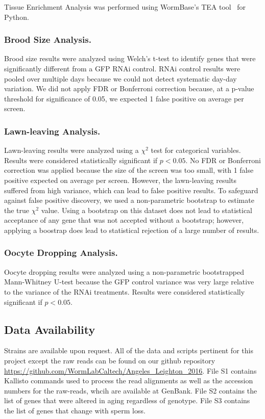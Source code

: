 \documentclass[9pt,twocolumn,twoside]{gsag3jnl}
\begin{document}
Tissue Enrichment Analysis was performed using WormBase's TEA tool~\citep{Angeles-Albores2016} for Python.

\subsubsection{Brood Size Analysis.}

Brood size results were analyzed using Welch's t-test to identify genes that were significantly different from a GFP RNAi control. RNAi control results were pooled over multiple days because we could not detect systematic day-day variation. We did not apply FDR or Bonferroni correction because, at a p-value threshold for significance of 0.05, we expected 1 false positive on average per screen.

\subsubsection{Lawn-leaving Analysis.}

Lawn-leaving results were analyzed using a $\chi^2$ test for categorical variables. Results were considered statistically significant if $p<0.05$. No FDR or Bonferroni correction was applied because the size of the screen was too small, with 1 false positive expected on average per screen. However, the lawn-leaving results suffered from high variance, which can lead to false positive results.
To safeguard against false positive discovery, we used a non-parametric bootstrap to estimate the true $\chi^2$ value. Using a bootstrap on this dataset does not lead to statistical acceptance of any gene that was not accepted without a bootstrap; however, applying a boostrap does lead to statistical rejection of a large number of results.
\subsubsection{Oocyte Dropping Analysis.}

Oocyte dropping results were analyzed using a non-parametric bootstrapped Mann-Whitney U-test because the GFP control variance was very large relative to the variance of the RNAi treatments. Results were considered statistically significant if $p<0.05$.


\subsection{Data Availability}
\label{sb:data_availability}
Strains are available upon request. All of the data and scripts pertinent for this project except the raw reads can be found on our github repository \url{https://github.com/WormLabCaltech/Angeles_Leighton_2016}. File S1 contains Kallisto commands used to process the read alignments as well as the accession numbers for the raw-reads, whcih are available at GenBank. File S2 contains the list of genes that were altered in aging regardless of genotype. File S3 contains the list of genes that change with sperm loss.
\end{document}

